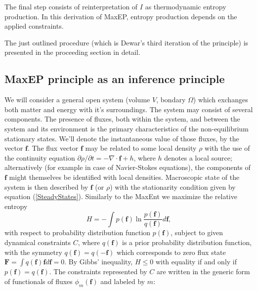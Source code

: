 \documentclass[a4paper,12pt]{article}
\begin{document}
The final step consists of reinterpretation of $I$ as thermodynamic entropy production. In this derivation of MaxEP, entropy production depends on the applied constraints.

The just outlined procedure (which is Dewar's third iteration of the principle) is presented in the proceeding section in detail.

\subsection{MaxEP principle as an inference principle}
\label{MaxEPInferenceSection}
We will consider a general open system (volume $V$, bondary $\Omega$) which exchanges both matter and energy with it's surroundings. The system may consist of several components.
The presence of fluxes, both within the system, and between the system and its environment is the primary characteristics of the non-equilibrium stationary states. We'll denote the instantaneous value of those fluxes, by the vector $\bm{f}$. The flux vector $\bm{f}$ may be related to some local density $\rho$ with the use of the continuity equation $\partial \rho / \partial t =  - \nabla \cdot \bm{f} + h$, where $h$ denotes a local source; alternatively (for example in case of Navier-Stokes equations), the components of $\bm{f}$ might themselves be identified with local densities. Macroscopic state of the system is then described by $\bm{f}$ (or $\rho$) with the stationarity condition given by equation (\ref{SteadyStates}).
Similarly to the MaxEnt we maximize the relative entropy
\begin{equation}
  H = - \int p(\bm{f})\ln \frac{p(\bm{f})}{q(\bm{f})} d\bm{f},
\end{equation}
with respect to probability distribution function $p(\bm{f})$, subject to given dynamical constraints $C$, where $q(\bm{f})$ is a prior probability distribution function, with the symmetry $q(\bm{f}) =q(\bm{-f})$ which corresponds to zero flux state $\bm{F}= \int q(\bm{f}) \bm{f} d\bm{f}=0 $.
By Gibbs' inequality, $H \leq 0$ with equality if and only if $p(\bm{f})=q(\bm{f})$.
The constraints represented by $C$ are written in the generic form of functionals of fluxes $\phi_m(\bm{f})$ and labeled by $m$:
\end{document}
